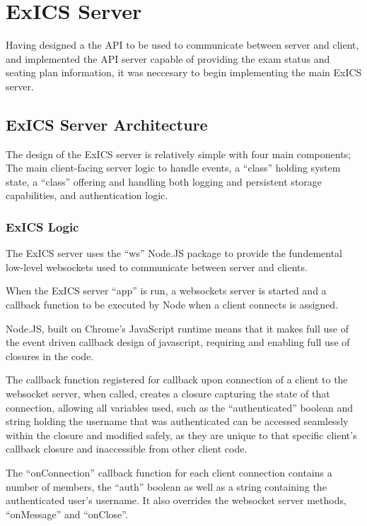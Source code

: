 \chapter{ExICS Server}

\label{ch:exicsserver}

Having designed a the API to be used to communicate between server and client, and implemented the API server capable of providing the exam status and seating plan information, it was neccesary to begin implementing the main ExICS server.

\section{ExICS Server Architecture}

The design of the ExICS server is relatively simple with four main components; The main client-facing server logic to handle events, a ``class'' holding system state, a ``class'' offering and handling both logging and persistent storage capabilities, and authentication logic.

\subsection{ExICS Logic}

The ExICS server uses the ``ws'' Node.JS package\cite{einarosWS} to provide the fundemental low-level websockets used to communicate between server and clients.

When the ExICS server ``app'' is run, a websockets server is started and a callback function to be executed by Node when a client connects is assigned.

Node.JS, built on Chrome's JavaScript runtime means that it makes full use of the event driven callback design of javascript, requiring and enabling full use of closures in the code.

The callback function registered for callback upon connection of a client to the websocket server, when called, creates a closure capturing the state of that connection, allowing all variables used, such as the ``authenticated'' boolean and string holding the username that was authenticated can be accessed seamlessly within the closure and modified safely, as they are unique to that specific client's callback closure and inaccessible from other client code.

The ``onConnection'' callback function for each client connection contains a number of members, the ``auth'' boolean as well as a string containing the authenticated user's username.  It also overrides the websocket server methods, ``onMessage'' and ``onClose''.


